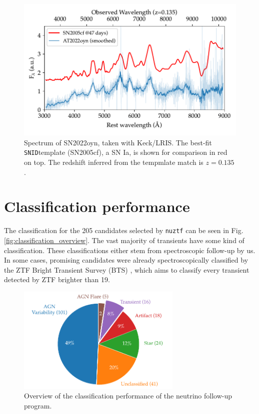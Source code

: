 \documentclass[
    a4paper, %
    fontsize=10pt, %
    twoside=true, %
    numbers=noenddot, %
    fontmethod=tex,
]{kaobook}
\begin{document}
\begin{figure}[htb]
    \includegraphics[width=1\textwidth]{fu/ZTF22aatwsqt_spectrum.pdf}
    \caption[SN2022oyn spectrum]{Spectrum of SN2022oyn, taken with Keck/LRIS. The best-fit \texttt{SNID}template (SN2005cf), a SN Ia, is shown for comparison in red on top. The redshift inferred from the tempmlate match is $z=0.135$.}
\end{figure}

\section{Classification performance}
The classification for the 205 candidates selected by \texttt{nuztf} can be seen in Fig. \ref{fig:classification_overview}. The vast majority of transients have some kind of classification. These classifications either stem from spectroscopic follow-up by us. In some cases, promising candidates were already spectroscopically classified by the ZTF Bright Transient Survey (BTS) , which aims to classify every transient detected by ZTF brighter than \SI{19}{\mag}.

\begin{figure}[h!]
    \includegraphics[width=0.7\textwidth]{fu/classification_overview.pdf}
    \caption[Follow-up classification overview]{Overview of the classification performance of the neutrino follow-up program.}
\end{figure}
\end{document}
